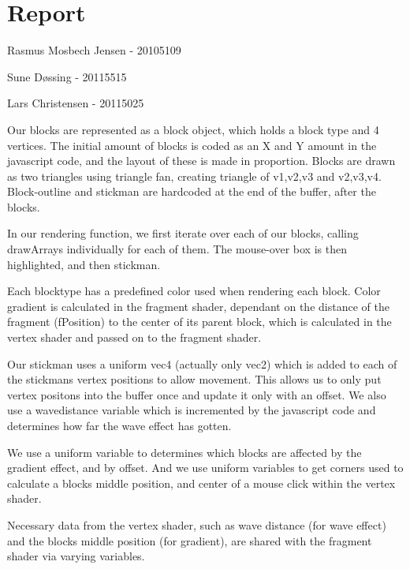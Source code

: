 \section{Report}

Rasmus Mosbech Jensen - 20105109

Sune D\o ssing - 20115515 

Lars Christensen - 20115025


Our blocks are represented as a block object, which holds a block type and 4 vertices.
The initial amount of blocks is coded as an X and Y amount in the javascript code,
and the layout of these is made in proportion.
Blocks are drawn as two triangles using triangle fan, creating triangle of v1,v2,v3 and v2,v3,v4.
Block-outline and stickman are hardcoded at the end of the buffer, after the blocks.

In our rendering function, we first iterate over each of our blocks, calling drawArrays individually for each of them. The mouse-over box is then highlighted, and then stickman.


Each blocktype has a predefined color used when rendering each block.
Color gradient is calculated in the fragment shader, 
dependant on the distance of the fragment (fPosition) to the center of its parent block,
which is calculated in the vertex shader and passed on to the fragment shader.



Our stickman uses a uniform vec4 (actually only vec2) which is added to each of the stickmans vertex positions to allow movement.
This allows us to only put vertex positons into the buffer once and update it only with an offset. 
We also use a wavedistance variable which is incremented by the javascript code and determines how far the wave effect has gotten.

We use a uniform variable to determines which blocks are affected by the gradient effect, and by offset.
And we use uniform variables to get corners used to calculate a blocks middle position, and center of a mouse click within the vertex shader.

Necessary data from the vertex shader, 
such as wave distance (for wave effect) and the blocks middle position (for gradient), 
are shared with the fragment shader via varying variables.

